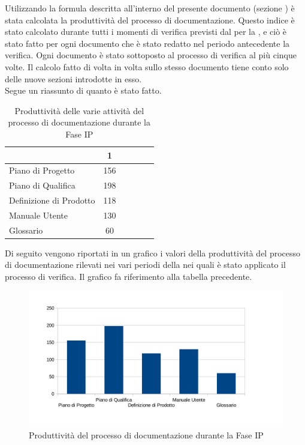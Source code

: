 	Utilizzando la formula descritta all'interno del presente documento (sezione ) è stata calcolata la produttività del processo di documentazione. Questo indice è stato calcolato durante tutti i momenti di verifica previsti dal  per la , e ciò è stato fatto per ogni documento che è stato redatto nel periodo antecedente la verifica. Ogni documento è stato sottoposto al processo di verifica al più cinque volte. Il calcolo fatto di volta in volta sullo stesso documento tiene conto solo delle nuove sezioni introdotte in esso.\\
	Segue un riassunto di quanto è stato fatto.
	\begin{table}[H]
		  \centering
			\begin{tabu}{| l | c | c | c | c | c |}
			\hline
			&1		\\ \hline
			Piano di Progetto	& 156 \\ \hline
			Piano di Qualifica	& 198\\ \hline
			Definizione di Prodotto & 118 \\ \hline
			Manuale Utente & 130	 \\ \hline
			Glossario & 60 \\ \hline
			\end{tabu}
			\caption{Produttività delle varie attività del processo di documentazione durante la Fase IP}
	\end{table}
	Di seguito vengono riportati in un grafico i valori della produttività del processo di documentazione rilevati nei vari periodi della  nei quali è stato applicato il processo di verifica. Il grafico fa riferimento alla tabella precedente.\\
	\begin{figure}[H]
		\centering
			\includegraphics[width=12cm]{PianoDiQualifica/Pics/ProduttivitaDocumentazioneFaseIP.pdf}
		\caption{Produttività del processo di documentazione durante la Fase IP}
	\end{figure}

